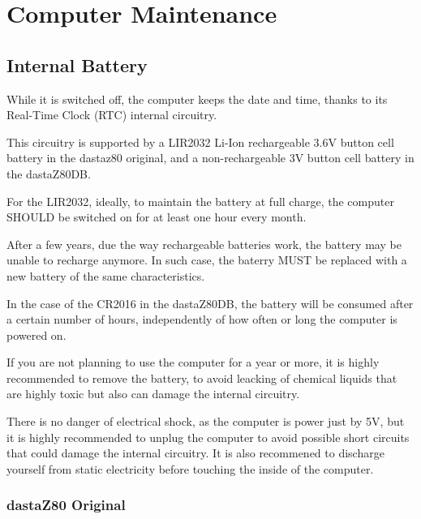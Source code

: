 \section{Computer Maintenance}

    \subsection{Internal Battery}

    While it is switched off, the computer keeps the date and time, thanks to
    its Real-Time Clock (RTC) internal circuitry.

    This circuitry is supported by a LIR2032 Li-Ion rechargeable 3.6V button
    cell battery in the dastaz80 original, and a non-rechargeable 3V button
    cell battery in the dastaZ80DB.

    For the LIR2032, ideally, to maintain the battery at full charge, the
    computer SHOULD be switched on for at least one hour every month.

    After a few years, due the way rechargeable batteries work, the battery may
    be unable to recharge anymore. In such case, the baterry MUST be replaced
    with a new battery of the same characteristics.

    In the case of the CR2016 in the dastaZ80DB, the battery will be consumed
    after a certain number of hours, independently of how often or long the
    computer is powered on.

    If you are not planning to use the computer for a year or more, it is highly
    recommended to remove the battery, to avoid leacking of chemical liquids
    that are highly toxic but also can damage the internal circuitry.

    There is no danger of electrical shock, as the computer is power just by 5V,
    but it is highly recommended to unplug the computer to avoid possible short
    circuits that could damage the internal circuitry. It is also recommened to
    discharge yourself from static electricity before touching the inside of the
    computer.

        \subsubsection{dastaZ80 Original}

